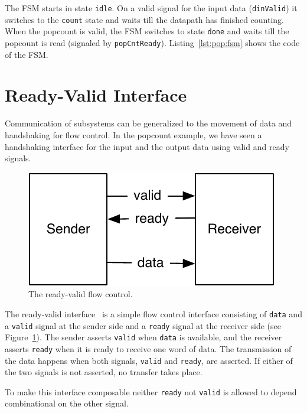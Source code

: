 \documentclass[%
    10pt,
    headinclude, footexclude,
    openright, %
    notitlepage,
    cleardoubleempty,
    headsepline,
    pointlessnumbers,
    bibtotoc, idxtotoc,
    ]{scrbook}
\newcommand{\code}[1]{{\small{\texttt{#1}}}}
\newcommand{\scale}{0.7}
\newcommand{\todo}[1]{{\emph{TODO: #1}}}
\renewcommand{\todo}[1]{}
\begin{document}
The FSM starts in state \code{idle}. On a valid signal for the input data (\code{dinValid}) it
switches to the \code{count} state and waits till the datapath has finished counting.
When the popcount is valid, the FSM switches to state \code{done} and waits till the
popcount is read (signaled by \code{popCntReady}).
Listing~\ref{lst:pop:fsm} shows the code of the FSM.


\section{Ready-Valid Interface}

\todo{Luca: This comes very sudden after all this FSM reading.
Maybe give some more context and a timing diagram.}

Communication of subsystems can be generalized to the movement
of data and handshaking for flow control. In the popcount example,
we have seen a handshaking interface for the input and the output data
using valid and ready signals.

\begin{figure}
  \centering
  \includegraphics[scale=\scale]{figures/readyvalid}
  \caption{The ready-valid flow control.}
  \label{fig:readyvalid}
\end{figure}

The ready-valid interface~\cite[p.~480]{dally:vhdl:2016} is a simple flow
control interface consisting of \code{data} and a \code{valid} signal at the
sender side and a \code{ready} signal at the receiver side (see
Figure~\ref{fig:readyvalid}). The sender asserts \code{valid} when \code{data} is available,
and the receiver asserts \code{ready} when it is ready to receive one word
of data. The transmission of the data happens when both signals, \code{valid}
and \code{ready}, are asserted. If either of the two signals is not asserted,
no transfer takes place.

To make this interface composable neither \code{ready} not \code{valid} is
allowed to depend combinational on the other signal.
\end{document}
